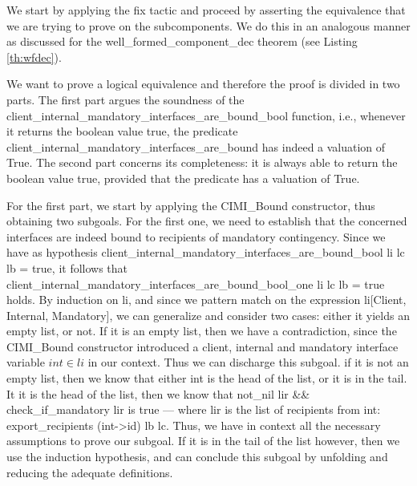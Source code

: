 	\begin{lemma} \label{th:cltintmandcorrect} 
			
		
		We start by applying the \textsf{fix} tactic and proceed by asserting the equivalence
	that we are trying to prove on the sub\textsf{component}s. We do this in an analogous
	manner as discussed for the \textsf{well\_formed\_component\_dec} theorem (see Listing \ref{th:wfdec}).
				
		We want to prove a logical equivalence and therefore the proof is divided in two parts. 
	The first part argues the soundness of the 
	\textsf{client_internal_mandatory_interfaces_are_bound_bool} function, i.e., 
	whenever it returns the boolean value true, the predicate \textsf{client_internal_mandatory_interfaces_are_bound}
	has indeed a valuation of True. The second part concerns its completeness: it is always able
	to return the boolean value true, provided that the predicate has a valuation of True.
	
		For the first part, we start by applying the \textsf{CIMI_Bound}	 constructor, thus obtaining two subgoals.
	For the first one, we need to establish that the concerned \textsf{interface}s are indeed bound to recipients
	of \textsf{mandatory} \textsf{contingency}. Since we have as hypothesis 
	\textsf{client_internal_mandatory_interfaces_are_bound_bool li lc lb = true}, it follows that
	\textsf{client_internal_mandatory_interfaces_are_bound_bool_one li lc lb = true} holds.
	By induction on \textsf{li}, and since we pattern match on the expression \textsf{li[Client, Internal, Mandatory]},
	we can generalize and consider two cases: either it yields an empty list,
	or not. If it is an empty list, then we have a contradiction, since
	the \textsf{CIMI_Bound} constructor introduced a \textsf{client}, \textsf{internal} and \textsf{mandatory}
	\textsf{interface} variable \textsf{$int \in li$} in our context. Thus we can discharge this subgoal.
	if it is not an empty list,	then we know that either \textsf{int} is the head of the list, or it is
	in the tail.  It it is the head of the list,  then we know that \textsf{not_nil lir \&\& check_if_mandatory lir}
	is true --- where \textsf{lir} is the list of recipients from \textsf{int}: \textsf{export_recipients (int->id) lb lc}.    
	Thus, we have in context all the necessary assumptions to prove our subgoal.	If it is in the tail of the list however,
	then we use the induction hypothesis, and can conclude this subgoal by unfolding and reducing the 
	adequate definitions.
	

\end{lemma}
